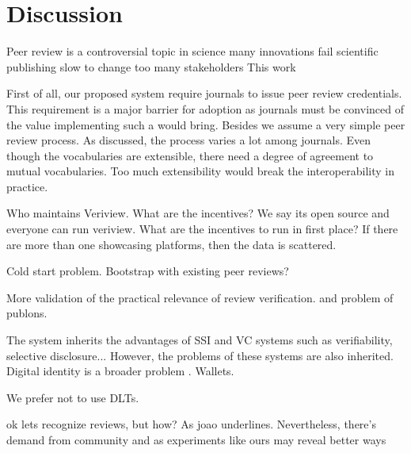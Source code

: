
\chapter{Discussion}\label{chapter:discussion}

Peer review is a controversial topic in science
many innovations fail
scientific publishing slow to change
too many stakeholders
This work 

First of all, our proposed system require journals to issue peer review credentials. This requirement is a major barrier for adoption as journals must be convinced of the value implementing such a would bring. Besides we assume a very simple peer review process. As discussed, the process varies a lot among journals. Even though the vocabularies are extensible, there need a degree of agreement to mutual vocabularies. Too much extensibility would break the interoperability in practice. 

Who maintains Veriview. What are the incentives? We say its open source and everyone can run veriview. What are the incentives to run in first place? If there are more than one showcasing platforms, then the data is scattered. 

Cold start problem. Bootstrap with existing peer reviews?

More validation of the practical relevance of review verification. and problem of publons. 

The system inherits the advantages of \acrshort{SSI} and \acrshort{VC} systems such as verifiability, selective disclosure... However, the problems of these systems are also inherited. Digital identity is a broader problem . Wallets.

We prefer not to use DLTs.

ok lets recognize reviews, but how? As joao underlines. Nevertheless, there's demand from community and as experiments like ours may reveal better ways